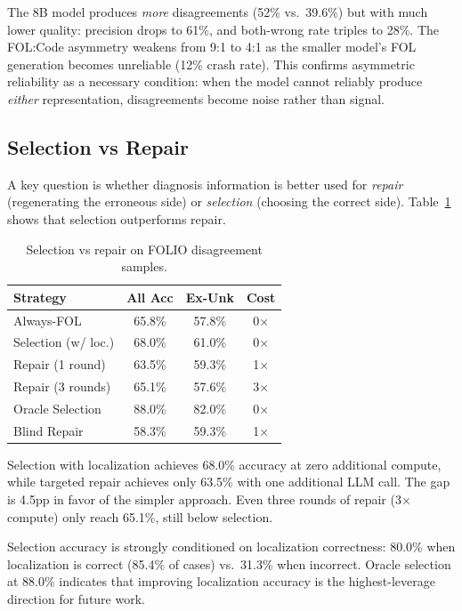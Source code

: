 \documentclass[11pt,a4paper]{article}
\begin{document}
The 8B model produces \textit{more} disagreements (52\% vs.\ 39.6\%) but with much lower quality: precision drops to 61\%, and both-wrong rate triples to 28\%. The FOL:Code asymmetry weakens from 9:1 to 4:1 as the smaller model's FOL generation becomes unreliable (12\% crash rate). This confirms asymmetric reliability as a necessary condition: when the model cannot reliably produce \textit{either} representation, disagreements become noise rather than signal.

\subsection{Selection vs Repair}
\label{sec:selection}

A key question is whether diagnosis information is better used for \textit{repair} (regenerating the erroneous side) or \textit{selection} (choosing the correct side). Table~\ref{tab:sel_rep} shows that selection outperforms repair.

\begin{table}[t]
\centering
\small
\caption{Selection vs repair on FOLIO disagreement samples.}
\label{tab:sel_rep}
\begin{tabular}{lccc}
\toprule
\textbf{Strategy} & \textbf{All Acc} & \textbf{Ex-Unk} & \textbf{Cost} \\
\midrule
Always-FOL & 65.8\% & 57.8\% & 0$\times$ \\
Selection (w/ loc.) & 68.0\% & 61.0\% & 0$\times$ \\
Repair (1 round) & 63.5\% & 59.3\% & 1$\times$ \\
Repair (3 rounds) & 65.1\% & 57.6\% & 3$\times$ \\
Oracle Selection & 88.0\% & 82.0\% & 0$\times$ \\
Blind Repair & 58.3\% & 59.3\% & 1$\times$ \\
\bottomrule
\end{tabular}
\end{table}

Selection with localization achieves 68.0\% accuracy at zero additional compute, while targeted repair achieves only 63.5\% with one additional LLM call. The gap is 4.5pp in favor of the simpler approach. Even three rounds of repair (3$\times$ compute) only reach 65.1\%, still below selection.

Selection accuracy is strongly conditioned on localization correctness: 80.0\% when localization is correct (85.4\% of cases) vs.\ 31.3\% when incorrect. Oracle selection at 88.0\% indicates that improving localization accuracy is the highest-leverage direction for future work.
\end{document}
